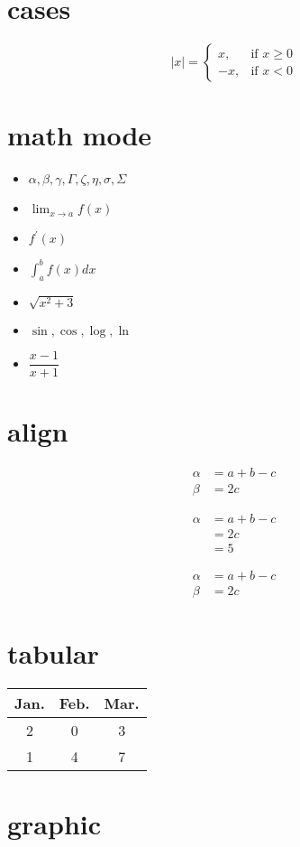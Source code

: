 \documentclass[12pt]{article}  %
\begin{document}
\section*{cases}
$$ |x|=
\begin{cases}
x,  & \mbox{if $x \geq 0$} \\
-x, & \mbox{if $x < 0$}
\end{cases}$$

\section*{math mode}
\begin{itemize}
	\item $ \alpha, \beta, \gamma, \Gamma, \zeta, \eta, \sigma, \Sigma $
	\item $ \displaystyle \lim_{x \to a} f(x) $
	\item $ f^\prime(x) $
	\item $ \displaystyle \int_a^b f(x) dx $
	\item $ \sqrt{x^2+3} $
	\item $ \sin, \cos, \log, \ln $
	\item $ \dfrac{x-1}{x+1} $
\end{itemize}

\section*{align}
\begin{align}
	\alpha &= a + b - c \\
	\beta  &= 2c
\end{align}

\begin{align*}
	\alpha &= a + b - c \\
		   &= 2c \\
		   &= 5
\end{align*}

\begin{equation} \begin{split}
	\alpha &= a + b - c \\
	\beta  &= 2c
\end{split} \end{equation}

\section*{tabular}
\begin{center}  %
\begin{tabular}{ccc}
	\toprule[2pt]
	Jan. & Feb. & Mar. \\
	\midrule[1pt]
	2 & 0 & 3 \\
	1 & 4 & 7 \\
	\bottomrule[2pt]
\end{tabular}
\end{center}

\section*{graphic}
\end{document}
